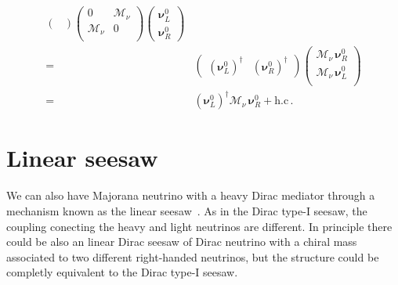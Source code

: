 \begin{frame}
\begin{align}
\begin{pmatrix}
  \end{pmatrix}
  \begin{pmatrix}
                                      0 & \boldsymbol{\mathcal{M}}_{\nu} \\
                                      \boldsymbol{\mathcal{M}}_{\nu} & 0 \\
                                    \end{pmatrix}
\begin{pmatrix}
    \boldsymbol{\nu}_L^{0} \\
    \boldsymbol{\nu}_R^{0}
  \end{pmatrix} \nonumber\\
=&  \begin{pmatrix}
    \left( \boldsymbol{\nu}_L^0 \right)^{\dagger}&
    \left(\boldsymbol{\nu}_R^0  \right)^{\dagger}
  \end{pmatrix}
  \begin{pmatrix}
         \boldsymbol{\mathcal{M}}_{\nu}\,\boldsymbol{\nu}_R^{0} \\
    \boldsymbol{\mathcal{M}}_{\nu}\, \boldsymbol{\nu}_L^{0} \\
  \end{pmatrix} \nonumber\\
  =&\left( \boldsymbol{\nu}_L^0 \right)^{\dagger} \boldsymbol{\mathcal{M}}_{\nu}\,   \boldsymbol{\nu}_R^{0} +\text{h.c}\,.
\end{align}
\end{frame}

\section{Linear seesaw}

We can also have Majorana neutrino with a heavy Dirac mediator through a mechanism known as the linear seesaw~\cite{Cordero-Carrion:2019qtu}. As in the Dirac type-I seesaw, the coupling conecting the heavy and light neutrinos are different. In principle there could be also an linear Dirac seesaw of Dirac neutrino with a chiral mass associated to two different right-handed neutrinos, but the structure could be completly equivalent to the Dirac type-I seesaw. 

